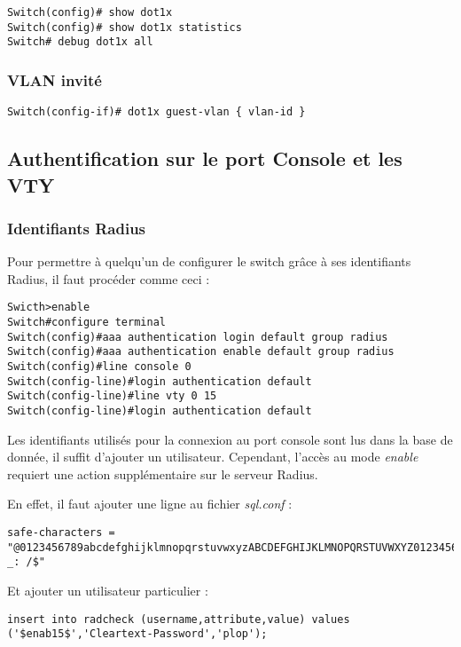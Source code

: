 \begin{verbatim}
Switch(config)# show dot1x
Switch(config)# show dot1x statistics
Switch# debug dot1x all
\end{verbatim}

\subsubsection{VLAN invité}

\begin{verbatim}
Switch(config-if)# dot1x guest-vlan { vlan-id }
\end{verbatim}



\subsection{Authentification sur le port Console et les VTY}

\subsubsection{Identifiants Radius}

Pour permettre à quelqu'un de configurer le switch grâce à ses identifiants Radius, il faut procéder comme ceci :

\begin{verbatim}
Swicth>enable
Switch#configure terminal
Switch(config)#aaa authentication login default group radius
Switch(config)#aaa authentication enable default group radius
Switch(config)#line console 0
Switch(config-line)#login authentication default
Switch(config-line)#line vty 0 15
Switch(config-line)#login authentication default
\end{verbatim}

Les identifiants utilisés pour la connexion au port console sont lus dans la base de donnée, il suffit d'ajouter un utilisateur. Cependant, l'accès au mode \textit{enable} requiert une action supplémentaire sur le serveur Radius.

En effet, il faut ajouter une ligne au fichier \textit{sql.conf} :

\begin{verbatim}
safe-characters = "@0123456789abcdefghijklmnopqrstuvwxyzABCDEFGHIJKLMNOPQRSTUVWXYZ0123456789.-_: /$"
\end{verbatim}

Et ajouter un utilisateur particulier :

\begin{verbatim}
insert into radcheck (username,attribute,value) values ('$enab15$','Cleartext-Password','plop');
\end{verbatim}

